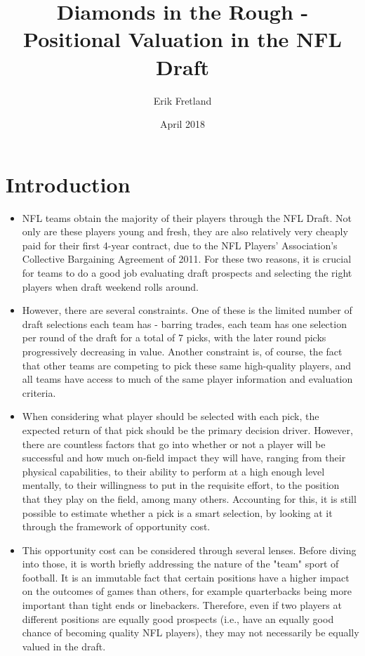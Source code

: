 \documentclass{article}
\title{Diamonds in the Rough - Positional Valuation in the NFL Draft}
\author{Erik Fretland}
\date{April 2018}
\begin{document}
\maketitle




\section{Introduction}
\begin{itemize}
    \item NFL teams obtain the majority of their players through the NFL Draft. Not only are these players young and fresh, they are also relatively very cheaply paid for their first 4-year contract, due to the NFL Players' Association's Collective Bargaining Agreement of 2011. For these two reasons, it is crucial for teams to do a good job evaluating draft prospects and selecting the right players when draft weekend rolls around. 
    \item However, there are several constraints. One of these is the limited number of draft selections each team has - barring trades, each team has one selection per round of the draft for a total of 7 picks, with the later round picks progressively decreasing in value. Another constraint is, of course, the fact that other teams are competing to pick these same high-quality players, and all teams have access to much of the same player information and evaluation criteria.
    \item When considering what player should be selected with each pick, the expected return of that pick should be the primary decision driver. However, there are countless factors that go into whether or not a player will be successful and how much on-field impact they will have, ranging from their physical capabilities, to their ability to perform at a high enough level mentally, to their willingness to put in the requisite effort, to the position that they play on the field, among many others. Accounting for this, it is still possible to estimate whether a pick is a smart selection, by looking at it through the framework of opportunity cost. 
    \item This opportunity cost can be considered through several lenses. Before diving into those, it is worth briefly addressing the nature of the "team" sport of football. It is an immutable fact that certain positions have a higher impact on the outcomes of games than others, for example quarterbacks being more important than tight ends or linebackers. Therefore, even if two players at different positions are equally good prospects (i.e., have an equally good chance of becoming quality NFL players), they may not necessarily be equally valued in the draft. 

\end{itemize}
\end{document}
